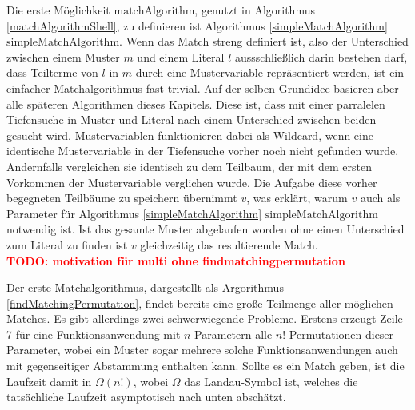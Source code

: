 \documentclass{scrartcl}
\numberwithin{figure}{section} %
\theoremstyle{definition} %
\newcommand{\BFred}[1]{\textbf{\textcolor{red}{#1}}}
\begin{document}
Die erste Möglichkeit $\mathrm{matchAlgorithm}$, genutzt in Algorithmus \ref{matchAlgorithmShell}, zu definieren ist Algorithmus \ref{simpleMatchAlgorithm} $\mathrm{simpleMatchAlgorithm}$.
Wenn das Match streng definiert ist, also der Unterschied zwischen einem Muster $m$ und einem Literal $l$ aussschließlich darin bestehen darf, dass Teilterme von $l$ in $m$ durch eine Mustervariable repräsentiert werden, ist ein einfacher Matchalgorithmus fast trivial. Auf der selben Grundidee basieren aber alle späteren Algorithmen dieses Kapitels. Diese ist, dass mit einer parralelen Tiefensuche in Muster und Literal nach einem Unterschied zwischen beiden gesucht wird. Mustervariablen funktionieren dabei als Wildcard, wenn eine identische Mustervariable in der Tiefensuche vorher noch nicht gefunden wurde. Andernfalls vergleichen sie identisch zu dem Teilbaum, der mit dem ersten Vorkommen der Mustervariable verglichen wurde. Die Aufgabe diese vorher begegneten Teilbäume zu speichern übernimmt $v$, was erklärt, warum $v$ auch als Parameter für Algorithmus \ref{simpleMatchAlgorithm} $\mathrm{simpleMatchAlgorithm}$ notwendig ist. Ist das gesamte Muster abgelaufen worden ohne einen Unterschied zum Literal zu finden ist $v$ gleichzeitig das resultierende Match.\\

\BFred{TODO: motivation für multi ohne findmatchingpermutation}

Der erste Matchalgorithmus, dargestellt als Argorithmus \ref{findMatchingPermutation}, findet bereits eine große Teilmenge aller möglichen Matches. Es gibt allerdings zwei schwerwiegende Probleme. Erstens erzeugt Zeile 7 für eine Funktionsanwendung mit $n$ Parametern alle $n!$ Permutationen dieser Parameter, wobei ein Muster sogar mehrere solche Funktionsanwendungen auch mit gegenseitiger Abstammung enthalten kann. Sollte es ein Match geben, ist die Laufzeit damit in $\Omega(n!)$, wobei  $\Omega$ das Landau-Symbol ist, welches die tatsächliche Laufzeit asymptotisch nach unten abschätzt.
\end{document}

